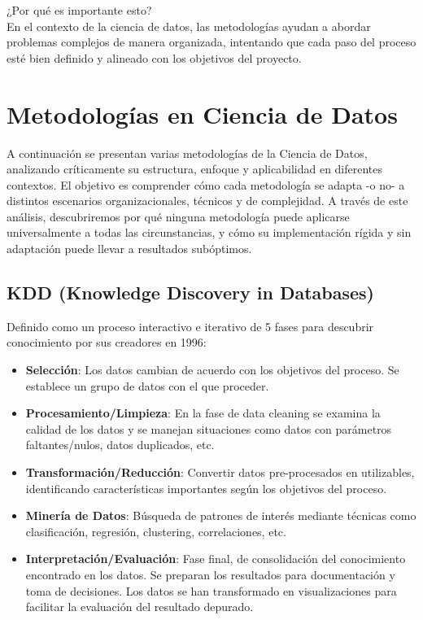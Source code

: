 \documentclass[12pt]{book}
\begin{document}
¿Por qué es importante esto?\\
En el contexto de la ciencia de datos, las metodologías ayudan a abordar problemas complejos de manera organizada, intentando que cada paso del proceso esté bien definido y alineado con los objetivos del proyecto. 


\section{Metodologías en Ciencia de Datos}
\label{sec:metodologias}

A continuación se presentan varias metodologías de la Ciencia de Datos, analizando críticamente su estructura, enfoque y aplicabilidad en diferentes contextos. El objetivo es comprender cómo cada metodología se adapta -o no- a distintos escenarios organizacionales, técnicos y de complejidad. A través de este análisis, descubriremos por qué ninguna metodología puede aplicarse universalmente a todas las circunstancias, y cómo su implementación rígida y sin adaptación puede llevar a resultados subóptimos.

\subsection{KDD (Knowledge Discovery in Databases)}
Definido como un proceso interactivo e iterativo de 5 fases para descubrir conocimiento por sus creadores en 1996:
\begin{itemize}
    \item \textbf{Selección}: Los datos cambian de acuerdo con los objetivos del proceso. Se establece un grupo de datos con el que proceder.
    \item \textbf{Procesamiento/Limpieza}: En la fase de data cleaning se examina la calidad de los datos y se manejan situaciones como     datos con parámetros faltantes/nulos, datos duplicados, etc.
    \item \textbf{Transformación/Reducción}: Convertir datos pre-procesados en utilizables, identificando características importantes según los objetivos del proceso.
    \item \textbf{Minería de Datos}: Búsqueda de patrones de interés mediante técnicas como clasificación, regresión, clustering, correlaciones, etc.
    \item \textbf{Interpretación/Evaluación}: Fase final, de consolidación del conocimiento encontrado en los datos. Se preparan los resultados para documentación y toma de decisiones. Los datos se han transformado en visualizaciones para facilitar la evaluación del resultado depurado.
\end{itemize}
\end{document}
